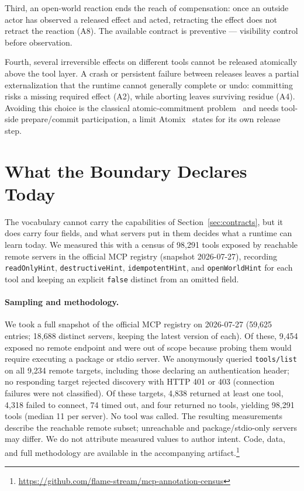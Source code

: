 \documentclass{article}
\begin{document}
Third, an open-world reaction ends the reach of compensation: once an outside
actor has observed a released effect and acted, retracting the effect does
not retract the reaction (A8). The available contract is preventive ---
visibility control before observation.

Fourth, several irreversible effects on different tools cannot be released
atomically above the tool layer. A crash or persistent failure between
releases leaves a partial externalization that the runtime cannot generally
complete or undo: committing risks a missing required effect (A2), while
aborting leaves surviving residue (A4). Avoiding this choice is the
classical atomic-commitment problem~\cite{bernstein1987concurrency} and
needs tool-side prepare/commit participation, a limit
Atomix~\cite{mohammadi2026atomix} states for its own release step.

\section{What the Boundary Declares Today}
\label{sec:grounding}

The vocabulary cannot carry the capabilities of Section~\ref{sec:contracts},
but it does carry four fields, and what servers put in them decides what
a runtime can learn today. We measured this with a census of 98{,}291
tools exposed by reachable remote servers in the official MCP registry
(snapshot 2026-07-27), recording
\texttt{readOnlyHint}, \texttt{destructiveHint}, \texttt{idempotentHint},
and \texttt{openWorldHint} for each tool and keeping an explicit
\texttt{false} distinct from an omitted field.

\paragraph{Sampling and methodology.}
We took a full snapshot of the official MCP registry on 2026-07-27
(59{,}625 entries; 18{,}688 distinct servers, keeping the latest version of
each). Of these, 9{,}454 exposed no remote endpoint and were out of scope
because probing them would require executing a package or stdio server. We
anonymously queried \texttt{tools/list} on all 9{,}234 remote targets,
including those declaring an authentication header; no responding target
rejected discovery with HTTP 401 or 403 (connection failures were not
classified). Of these targets, 4{,}838 returned
at least one tool, 4{,}318 failed to connect, 74 timed out, and four
returned no tools, yielding 98{,}291 tools (median 11 per server). No
tool was called. The resulting measurements describe the reachable remote
subset; unreachable and package/stdio-only servers may differ. We do not attribute measured values to author intent. Code, data,
and full methodology are available in the accompanying
artifact.\footnote{\url{https://github.com/flame-stream/mcp-annotation-census}}
\end{document}
